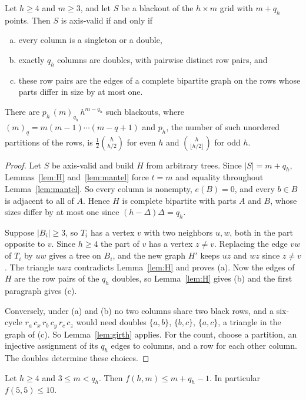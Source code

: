 \begin{theorem}\label{thm:equality}
Let $h\ge4$ and $m\ge3$, and let $S$ be a blackout of the $h\times m$ grid with $m+q_h$ points. Then $S$ is axis-valid if and only if
\begin{enumerate}[(a)]
\item every column is a singleton or a double,
\item exactly $q_h$ columns are doubles, with pairwise distinct row pairs, and
\item these row pairs are the edges of a complete bipartite graph on the rows whose parts differ in size by at most one.
\end{enumerate}
There are $p_h\,(m)_{q_h}\,h^{m-q_h}$ such blackouts, where $(m)_q=m(m-1)\cdots(m-q+1)$ and $p_h$, the number of such unordered partitions of the rows, is $\frac12\binom h{h/2}$ for even $h$ and $\binom h{\lfloor h/2\rfloor}$ for odd $h$.
\end{theorem}

\begin{proof}
Let $S$ be axis-valid and build $H$ from arbitrary trees. Since $|S|=m+q_h$, Lemmas~\ref{lem:H} and~\ref{lem:mantel} force $t=m$ and equality throughout Lemma~\ref{lem:mantel}. So every column is nonempty, $e(B)=0$, and every $b\in B$ is adjacent to all of $A$. Hence $H$ is complete bipartite with parts $A$ and $B$, whose sizes differ by at most one since $(h-\Delta)\Delta=q_h$.

Suppose $|B_i|\ge3$, so $T_i$ has a vertex $v$ with two neighbors $u,w$, both in the part opposite to $v$. Since $h\ge4$ the part of $v$ has a vertex $z\ne v$. Replacing the edge $vw$ of $T_i$ by $uw$ gives a tree on $B_i$, and the new graph $H'$ keeps $uz$ and $wz$ since $z\ne v$. The triangle $uwz$ contradicts Lemma~\ref{lem:H} and proves (a). Now the edges of $H$ are the row pairs of the $q_h$ doubles, so Lemma~\ref{lem:H} gives (b) and the first paragraph gives (c).

Conversely, under (a) and (b) no two columns share two black rows, and a six-cycle $r_a\,c_x\,r_b\,c_y\,r_c\,c_z$ would need doubles $\{a,b\}$, $\{b,c\}$, $\{a,c\}$, a triangle in the graph of (c). So Lemma~\ref{lem:girth} applies. For the count, choose a partition, an injective assignment of its $q_h$ edges to columns, and a row for each other column. The doubles determine these choices.
\end{proof}

\begin{corollary}\label{cor:small-m}
Let $h\ge4$ and $3\le m<q_h$. Then $f(h,m)\le m+q_h-1$. In particular $f(5,5)\le10$.
\end{corollary}

